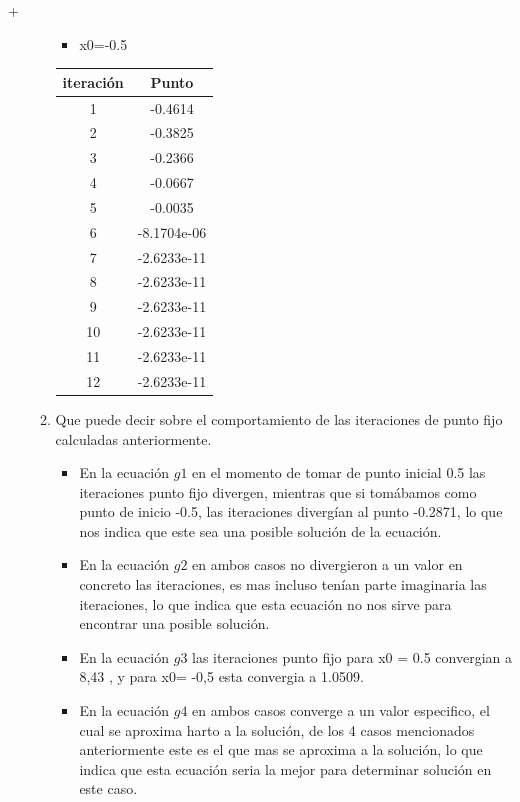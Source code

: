 +\documentclass{udpreport}
\begin{document}
\begin{enumerate}
\begin{enumerate}
\begin{table}[H]
    \end{table}
     \begin{itemize}
\item x0=-0.5
\end{itemize}
\begin{table}[H]
    \centering
        \begin{tabular} { |c|c|}
        \hline
        iteración  &  Punto\\
        \hline
        1 &  -0.4614      \\
         \hline
        2 &   -0.3825   \\
         \hline
        3 &  -0.2366 \\
         \hline
        4 &  -0.0667    \\
         \hline
        5 &   -0.0035 \\
         \hline
        6 & -8.1704e-06     \\
         \hline
        7 &     -2.6233e-11 \\
         \hline
        8 &   -2.6233e-11   \\
         \hline
        9 &        -2.6233e-11 \\
         \hline
        10 &     -2.6233e-11    \\
         \hline
        11 &    -2.6233e-11 \\
         \hline
        12 &    -2.6233e-11  \\
        \hline
        \end{tabular}
    \end{table}
    
\item Que puede decir sobre el comportamiento de las iteraciones de punto fijo calculadas anteriormente.
\begin{itemize}

\item En la ecuación $g1$ en el momento de tomar de punto inicial 0.5 las iteraciones punto fijo divergen, mientras que si tomábamos como punto de inicio -0.5, las iteraciones divergían al punto -0.2871, lo que nos indica que este sea una posible solución de la ecuación.
\item En la ecuación $g2$ en ambos casos no divergieron a un valor en concreto las iteraciones, es mas incluso tenían parte imaginaria las iteraciones, lo que indica que esta ecuación no nos sirve para encontrar una posible solución.
\item En la ecuación $g3$ las iteraciones punto fijo para x0 = 0.5 convergian a 8,43 , y para x0= -0,5 esta convergia a 1.0509.
\item En la ecuación $g4$ en ambos casos converge a un valor especifico, el cual se aproxima harto a la solución, de los 4 casos mencionados anteriormente este es el que mas se aproxima a la solución, lo que indica que esta ecuación seria la mejor para determinar solución en este caso.
\end{itemize}



\end{enumerate}
\end{enumerate}
\end{document}
